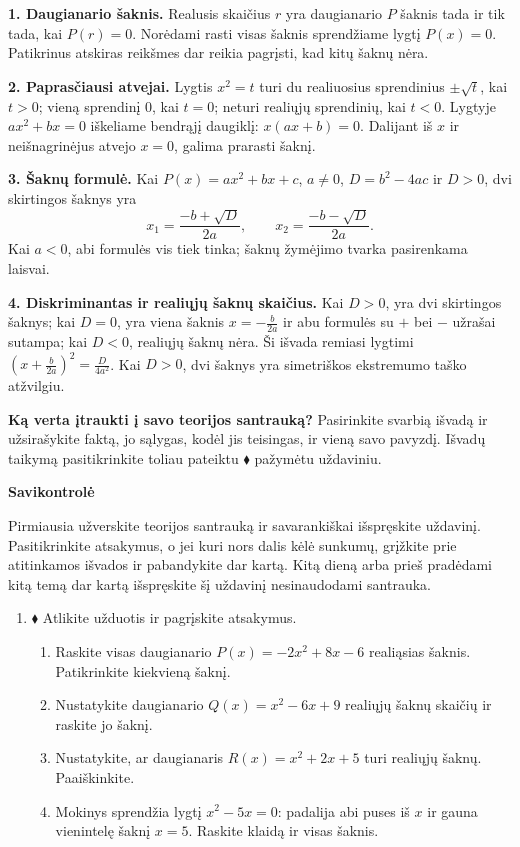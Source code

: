 \documentclass[12pt,a4paper]{article}
\newcommand{\svarbu}{\tikz[baseline=(zenklas.base)]\node[circle,draw=blue!50!black,line width=0.6pt,minimum size=4.5mm,inner sep=0pt,font=\sffamily\bfseries\small,text=blue!50!black] (zenklas) {!};}
\begin{document}
\begin{tcolorbox}[colback=blue!3,colframe=blue!40!black,boxrule=0.5pt,arc=1mm,colbacktitle=blue!8,coltitle=black,title={\svarbu\quad\bfseries Svarbiausios temos išvados}]
\textbf{1. Daugianario šaknis.} Realusis skaičius $r$ yra daugianario $P$ šaknis tada ir tik tada, kai $P(r)=0$. Norėdami rasti visas šaknis sprendžiame lygtį $P(x)=0$. Patikrinus atskiras reikšmes dar reikia pagrįsti, kad kitų šaknų nėra.

\textbf{2. Paprasčiausi atvejai.} Lygtis $x^2=t$ turi du realiuosius sprendinius $\pm\sqrt t$, kai $t>0$; vieną sprendinį $0$, kai $t=0$; neturi realiųjų sprendinių, kai $t<0$. Lygtyje $ax^2+bx=0$ iškeliame bendrąjį daugiklį: $x(ax+b)=0$. Dalijant iš $x$ ir neišnagrinėjus atvejo $x=0$, galima prarasti šaknį.

\textbf{3. Šaknų formulė.} Kai $P(x)=ax^2+bx+c$, $a\ne0$, $D=b^2-4ac$ ir $D>0$, dvi skirtingos šaknys yra
\[
x_1=\frac{-b+\sqrt D}{2a},\qquad x_2=\frac{-b-\sqrt D}{2a}.
\]
Kai $a<0$, abi formulės vis tiek tinka; šaknų žymėjimo tvarka pasirenkama laisvai.

\textbf{4. Diskriminantas ir realiųjų šaknų skaičius.} Kai $D>0$, yra dvi skirtingos šaknys; kai $D=0$, yra viena šaknis $x=-\frac b{2a}$ ir abu formulės su $+$ bei $-$ užrašai sutampa; kai $D<0$, realiųjų šaknų nėra. Ši išvada remiasi lygtimi $\left(x+\frac b{2a}\right)^2=\frac D{4a^2}$. Kai $D>0$, dvi šaknys yra simetriškos ekstremumo taško atžvilgiu.
\end{tcolorbox}
\textbf{Ką verta įtraukti į savo teorijos santrauką?} Pasirinkite svarbią išvadą ir užsirašykite faktą, jo sąlygas, kodėl jis teisingas, ir vieną savo pavyzdį. Išvadų taikymą pasitikrinkite toliau pateiktu $\blacklozenge$ pažymėtu uždaviniu.
\newpage
\begin{center}{\Large\bfseries Savikontrolė}\end{center}
Pirmiausia užverskite teorijos santrauką ir savarankiškai išspręskite uždavinį. Pasitikrinkite atsakymus, o jei kuri nors dalis kėlė sunkumų, grįžkite prie atitinkamos išvados ir pabandykite dar kartą. Kitą dieną arba prieš pradėdami kitą temą dar kartą išspręskite šį uždavinį nesinaudodami santrauka.
\begin{enumerate}[resume]
\item $\blacklozenge$ Atlikite užduotis ir pagrįskite atsakymus.
\begin{enumerate}
\item Raskite visas daugianario $P(x)=-2x^2+8x-6$ realiąsias šaknis. Patikrinkite kiekvieną šaknį.
\item Nustatykite daugianario $Q(x)=x^2-6x+9$ realiųjų šaknų skaičių ir raskite jo šaknį.
\item Nustatykite, ar daugianaris $R(x)=x^2+2x+5$ turi realiųjų šaknų. Paaiškinkite.
\item Mokinys sprendžia lygtį $x^2-5x=0$: padalija abi puses iš $x$ ir gauna vienintelę šaknį $x=5$. Raskite klaidą ir visas šaknis.
\end{enumerate}
\end{enumerate}
\end{document}
